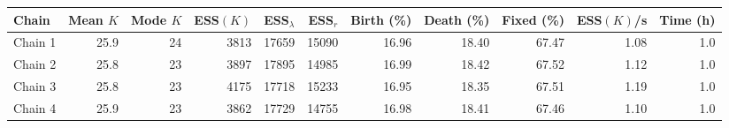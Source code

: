\begin{tabular}{l r r r r r r r r r r}
  \toprule
  Chain & Mean $K$ & Mode $K$ & ESS$(K)$ & ESS$_\lambda$ & ESS$_r$ & Birth (\%) & Death (\%) & Fixed (\%) & ESS$(K)$/s & Time (h) \\
  \midrule
  Chain 1 & 25.9 & 24 & 3813 & 17659 & 15090 & 16.96 & 18.40 & 67.47 & 1.08 & 1.0 \\
  Chain 2 & 25.8 & 23 & 3897 & 17895 & 14985 & 16.99 & 18.42 & 67.52 & 1.12 & 1.0 \\
  Chain 3 & 25.8 & 23 & 4175 & 17718 & 15233 & 16.95 & 18.35 & 67.51 & 1.19 & 1.0 \\
  Chain 4 & 25.9 & 23 & 3862 & 17729 & 14755 & 16.98 & 18.41 & 67.46 & 1.10 & 1.0 \\
  \bottomrule
\end{tabular}
